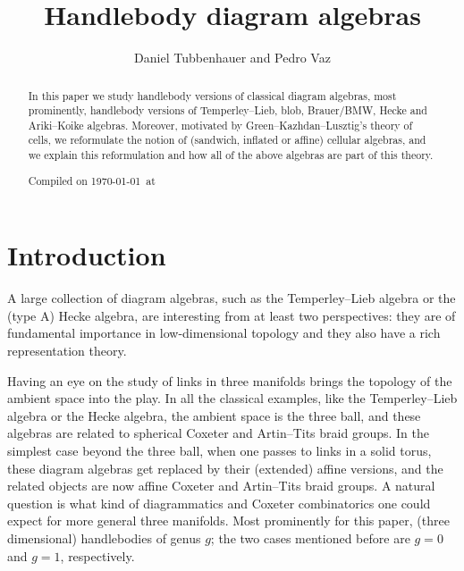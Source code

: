\documentclass[a4paper,11pt]{amsart}
\title[Handlebody diagram algebras]
{Handlebody diagram algebras}
\author[Daniel Tubbenhauer and Pedro Vaz]{Daniel Tubbenhauer and Pedro Vaz}
\numberwithin{equation}{section}
\renewcommand{\theequation}{\thesection-\arabic{equation}}
\begin{document}
\begin{abstract}
In this paper we study handlebody versions 
of classical diagram algebras, most prominently, 
handlebody versions of Temperley--Lieb, blob, 
Brauer/BMW, Hecke and Ariki--Koike algebras.
Moreover, motivated by Green--Kazhdan--Lusztig's 
theory of cells, we reformulate the notion of 
(sandwich, inflated or affine) cellular algebras,
and we explain this reformulation
and how all of the above algebras 
are part of this theory.

Compiled on \today\ at \currenttime
\end{abstract}

\renewcommand{\theequation}{\thesection-\arabic{equation}}


\maketitle

\tableofcontents

\section{Introduction}\label{section:intro}

A large collection of diagram algebras, such as the Temperley--Lieb algebra 
or the (type A) Hecke algebra, are interesting from at least two perspectives:
they are of fundamental importance in low-dimensional topology 
and they also have a rich representation theory.

Having an eye on the study of links in 
three manifolds brings the topology of the ambient space into the play.
In all the classical examples, like the Temperley--Lieb algebra or 
the Hecke algebra, the ambient space is the three ball, and these algebras 
are related to spherical Coxeter and Artin--Tits braid groups.
In the simplest case beyond the three ball, when one passes to links in a solid torus, 
these diagram algebras get replaced by their (extended) affine versions, 
and the related objects are now affine Coxeter and Artin--Tits braid groups.
A natural question is what kind of diagrammatics and Coxeter combinatorics 
one could expect for more general three manifolds. Most prominently 
for this paper, (three dimensional) handlebodies of genus $g$; the two cases mentioned 
before are $g=0$ and $g=1$, respectively.
\end{document}
